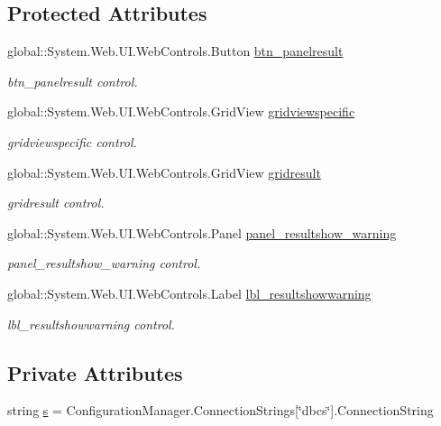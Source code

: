 \subsection*{Protected Attributes}
\begin{DoxyCompactItemize}
\item 
global\+::\+System.\+Web.\+U\+I.\+Web\+Controls.\+Button \mbox{\hyperlink{class_admin__result_a1940c6a65e956c85a8f47b671fe01c1a}{btn\+\_\+panelresult}}
\begin{DoxyCompactList}\small\item\em btn\+\_\+panelresult control. \end{DoxyCompactList}\item 
global\+::\+System.\+Web.\+U\+I.\+Web\+Controls.\+Grid\+View \mbox{\hyperlink{class_admin__result_a9fd3719ab16b4d12e8e607cf2e0bac5b}{gridviewspecific}}
\begin{DoxyCompactList}\small\item\em gridviewspecific control. \end{DoxyCompactList}\item 
global\+::\+System.\+Web.\+U\+I.\+Web\+Controls.\+Grid\+View \mbox{\hyperlink{class_admin__result_ac8582906385bb5c91b199218a6ba0138}{gridresult}}
\begin{DoxyCompactList}\small\item\em gridresult control. \end{DoxyCompactList}\item 
global\+::\+System.\+Web.\+U\+I.\+Web\+Controls.\+Panel \mbox{\hyperlink{class_admin__result_a4e937bad6adda7f00485a38d3b55b539}{panel\+\_\+resultshow\+\_\+warning}}
\begin{DoxyCompactList}\small\item\em panel\+\_\+resultshow\+\_\+warning control. \end{DoxyCompactList}\item 
global\+::\+System.\+Web.\+U\+I.\+Web\+Controls.\+Label \mbox{\hyperlink{class_admin__result_a02e38862159463673c5de3b4952a97f9}{lbl\+\_\+resultshowwarning}}
\begin{DoxyCompactList}\small\item\em lbl\+\_\+resultshowwarning control. \end{DoxyCompactList}\end{DoxyCompactItemize}
\subsection*{Private Attributes}
\begin{DoxyCompactItemize}
\item 
string \mbox{\hyperlink{class_admin__result_a1c2a8f8d70b46da7aae22c85df827aee}{s}} = Configuration\+Manager.\+Connection\+Strings\mbox{[}\char`\"{}dbcs\char`\"{}\mbox{]}.Connection\+String
\end{DoxyCompactItemize}


